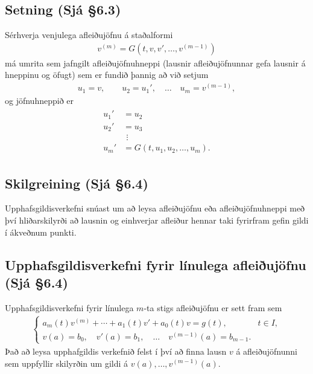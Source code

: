\documentclass[a4paper,10pt,icelandic]{sphinxmanual}
\begin{document}
\subsection{Setning (Sjá \S{}6.3)}
\label{\detokenize{Kafli06:setning-sja-6-3}}
Sérhverja venjulega afleiðujöfnu á staðalformi
\begin{equation*}
\begin{split}v^{(m)}=G(t,v,v',\dots,v^{(m-1)})\end{split}
\end{equation*}
má umrita sem jafngilt afleiðujöfnuhneppi (lausnir afleiðujöfnunnar gefa lausnir á hneppinu og öfugt) sem er fundið þannig að við setjum
\begin{equation*}
\begin{split}u_1=v, \qquad u_2=u_1', \quad \ldots\quad u_m=v^{(m-1)},\end{split}
\end{equation*}
og jöfnuhneppið er
\begin{equation*}
\begin{split}\begin{aligned}
u_1'&=u_2\\
u_2'&=u_3\\
&\ \,\vdots\\
u_m'&=G(t,u_1,u_2,\dots,u_m).\end{aligned}\end{split}
\end{equation*}

\subsection{Skilgreining (Sjá \S{}6.4)}
\label{\detokenize{Kafli06:skilgreining-sja-6-4}}
Upphafsgildisverkefni snúast um að leysa afleiðujöfnu eða afleiðujöfnuhneppi með því hliðarskilyrði að lausnin og einhverjar afleiður hennar taki fyrirfram gefin gildi í ákveðnum punkti.


\subsection{Upphafsgildisverkefni fyrir línulega afleiðujöfnu (Sjá \S{}6.4)}
\label{\detokenize{Kafli06:upphafsgildisverkefni-fyrir-linulega-afleiujofnu-sja-6-4}}
Upphafsgildisverkefni fyrir línulega \(m\)-ta stigs afleiðujöfnu er sett fram sem
\begin{equation*}
\begin{split}\begin{cases} a_m(t)v^{(m)}+\cdots+a_1(t)v'+a_0(t)v=g(t), & t\in I,\\
v(a)=b_0, \quad v'(a)=b_1, \quad \dots \quad  v^{(m-1)}(a)=b_{m-1}.&
\end{cases}\end{split}
\end{equation*}
Það að leysa upphafgildis verkefnið felst í því að finna lausn \(v\) á afleiðujöfnunni sem uppfyllir skilyrðin um gildi á \(v(a),\ldots, v^{(m-1)}(a)\).
\end{document}
